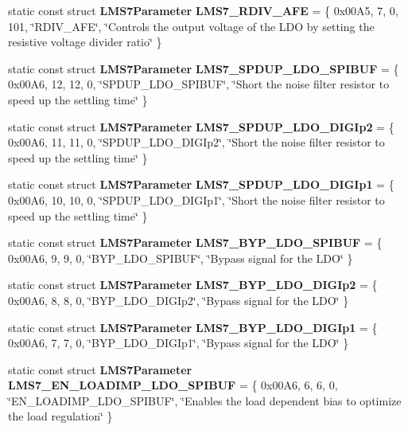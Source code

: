 \begin{DoxyCompactItemize}
\item 
static const struct {\bf L\+M\+S7\+Parameter} {\bf L\+M\+S7\+\_\+\+R\+D\+I\+V\+\_\+\+A\+FE} = \{ 0x00\+A5, 7, 0, 101, \char`\"{}\+R\+D\+I\+V\+\_\+\+A\+F\+E\char`\"{}, \char`\"{}\+Controls the output voltage of the L\+D\+O by setting the resistive voltage divider ratio\char`\"{} \}
\item 
static const struct {\bf L\+M\+S7\+Parameter} {\bf L\+M\+S7\+\_\+\+S\+P\+D\+U\+P\+\_\+\+L\+D\+O\+\_\+\+S\+P\+I\+B\+UF} = \{ 0x00\+A6, 12, 12, 0, \char`\"{}\+S\+P\+D\+U\+P\+\_\+\+L\+D\+O\+\_\+\+S\+P\+I\+B\+U\+F\char`\"{}, \char`\"{}\+Short the noise filter resistor to speed up the settling time\char`\"{} \}
\item 
static const struct {\bf L\+M\+S7\+Parameter} {\bf L\+M\+S7\+\_\+\+S\+P\+D\+U\+P\+\_\+\+L\+D\+O\+\_\+\+D\+I\+G\+Ip2} = \{ 0x00\+A6, 11, 11, 0, \char`\"{}\+S\+P\+D\+U\+P\+\_\+\+L\+D\+O\+\_\+\+D\+I\+G\+Ip2\char`\"{}, \char`\"{}\+Short the noise filter resistor to speed up the settling time\char`\"{} \}
\item 
static const struct {\bf L\+M\+S7\+Parameter} {\bf L\+M\+S7\+\_\+\+S\+P\+D\+U\+P\+\_\+\+L\+D\+O\+\_\+\+D\+I\+G\+Ip1} = \{ 0x00\+A6, 10, 10, 0, \char`\"{}\+S\+P\+D\+U\+P\+\_\+\+L\+D\+O\+\_\+\+D\+I\+G\+Ip1\char`\"{}, \char`\"{}\+Short the noise filter resistor to speed up the settling time\char`\"{} \}
\item 
static const struct {\bf L\+M\+S7\+Parameter} {\bf L\+M\+S7\+\_\+\+B\+Y\+P\+\_\+\+L\+D\+O\+\_\+\+S\+P\+I\+B\+UF} = \{ 0x00\+A6, 9, 9, 0, \char`\"{}\+B\+Y\+P\+\_\+\+L\+D\+O\+\_\+\+S\+P\+I\+B\+U\+F\char`\"{}, \char`\"{}\+Bypass signal for the L\+D\+O\char`\"{} \}
\item 
static const struct {\bf L\+M\+S7\+Parameter} {\bf L\+M\+S7\+\_\+\+B\+Y\+P\+\_\+\+L\+D\+O\+\_\+\+D\+I\+G\+Ip2} = \{ 0x00\+A6, 8, 8, 0, \char`\"{}\+B\+Y\+P\+\_\+\+L\+D\+O\+\_\+\+D\+I\+G\+Ip2\char`\"{}, \char`\"{}\+Bypass signal for the L\+D\+O\char`\"{} \}
\item 
static const struct {\bf L\+M\+S7\+Parameter} {\bf L\+M\+S7\+\_\+\+B\+Y\+P\+\_\+\+L\+D\+O\+\_\+\+D\+I\+G\+Ip1} = \{ 0x00\+A6, 7, 7, 0, \char`\"{}\+B\+Y\+P\+\_\+\+L\+D\+O\+\_\+\+D\+I\+G\+Ip1\char`\"{}, \char`\"{}\+Bypass signal for the L\+D\+O\char`\"{} \}
\item 
static const struct {\bf L\+M\+S7\+Parameter} {\bf L\+M\+S7\+\_\+\+E\+N\+\_\+\+L\+O\+A\+D\+I\+M\+P\+\_\+\+L\+D\+O\+\_\+\+S\+P\+I\+B\+UF} = \{ 0x00\+A6, 6, 6, 0, \char`\"{}\+E\+N\+\_\+\+L\+O\+A\+D\+I\+M\+P\+\_\+\+L\+D\+O\+\_\+\+S\+P\+I\+B\+U\+F\char`\"{}, \char`\"{}\+Enables the load dependent bias to optimize the load regulation\char`\"{} \}

\end{DoxyCompactItemize}
